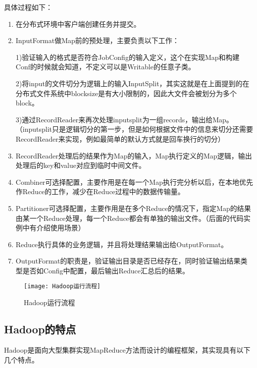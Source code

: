 具体过程如下：

\begin{enumerate}
\item 在分布式环境中客户端创建任务并提交。

\item InputFormat做Map前的预处理，主要负责以下工作：

1)验证输入的格式是否符合JobConfig的输入定义，这个在实现Map和构建Conf的时候就会知道，不定义可以是Writable的任意子类。

2)将input的文件切分为逻辑上的输入InputSplit，其实这就是在上面提到的在分布式文件系统中blocksize是有大小限制的，因此大文件会被划分为多个block。

3)通过RecordReader来再次处理inputsplit为一组records，输出给Map。（inputsplit只是逻辑切分的第一步，但是如何根据文件中的信息来切分还需要RecordReader来实现，例如最简单的默认方式就是回车换行的切分）

\item RecordReader处理后的结果作为Map的输入，Map执行定义的Map逻辑，输出处理后的key和value对应到临时中间文件。

\item Combiner可选择配置，主要作用是在每一个Map执行完分析以后，在本地优先作Reduce的工作，减少在Reduce过程中的数据传输量。

\item Partitioner可选择配置，主要作用是在多个Reduce的情况下，指定Map的结果由某一个Reduce处理，每一个Reduce都会有单独的输出文件。（后面的代码实例中有介绍使用场景）

\item Reduce执行具体的业务逻辑，并且将处理结果输出给OutputFormat。

\item OutputFormat的职责是，验证输出目录是否已经存在，同时验证输出结果类型是否如Config中配置，最后输出Reduce汇总后的结果。
\end{enumerate}

\begin{figure}
 \centering
 \texttt{[image: Hadoop运行流程]}
 \caption{Hadoop运行流程}
 \label{fig:Hadoop运行流程}
\end{figure}


\subsection{Hadoop的特点}
Hadoop是面向大型集群实现MapReduce方法而设计的编程框架，其实现具有以下几个特点。

